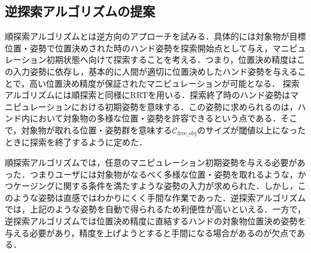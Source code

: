 \documentclass[a4paper,papersize,dvipdfmx]{mtabst}
\begin{document}
\subsection{逆探索アルゴリズムの提案}
順探索アルゴリズムとは逆方向のアプローチを試みる．具体的には対象物が目標位置・姿勢で位置決めされた時のハンド姿勢を探索開始点として与え，マニピュレーション初期状態へ向けて探索することを考える．つまり，位置決め精度はこの入力姿勢に依存し，基本的に人間が適切に位置決めしたハンド姿勢を与えることで，高い位置決め精度が保証されたマニピュレーションが可能となる．
探索アルゴリズムには順探索と同様にRRTを用いる．探索終了時のハンド姿勢はマニピュレーションにおける初期姿勢を意味する．この姿勢に求められるのは，ハンド内において対象物の多様な位置・姿勢を許容できるという点である．そこで，対象物が取れる位置・姿勢群を意味する$\mathcal{C}_{\mathrm {free\_obj}}$のサイズが閾値以上になったときに探索を終了するように定めた．\par
順探索アルゴリズムでは，任意のマニピュレーション初期姿勢を与える必要があった．つまりユーザには対象物がなるべく多様な位置・姿勢を取れるような，かつケージングに関する条件を満たすような姿勢の入力が求められた．しかし，このような姿勢は直感ではわかりにくく手間な作業であった．逆探索アルゴリズムでは，上記のような姿勢を自動で得られるため利便性が高いといえる．一方で，逆探索アルゴリズムでは位置決め精度に直結するハンドの対象物位置決め姿勢を与える必要があり，精度を上げようとすると手間になる場合があるのが欠点である．
\end{document}
